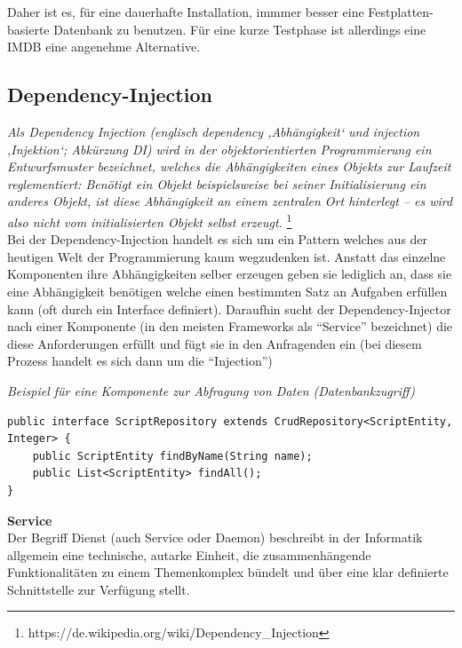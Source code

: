 Daher ist es, für eine dauerhafte Installation, immmer besser eine Festplatten-basierte Datenbank zu benutzen. Für eine kurze Testphase ist allerdings eine IMDB eine angenehme Alternative.

\subsection{Dependency-Injection}

\emph{\glqq   
Als Dependency Injection (englisch dependency ‚Abhängigkeit‘ und injection ‚Injektion‘; Abkürzung DI) wird in der objektorientierten Programmierung ein Entwurfsmuster bezeichnet, welches die Abhängigkeiten eines Objekts zur Laufzeit reglementiert: Benötigt ein Objekt beispielsweise bei seiner Initialisierung ein anderes Objekt, ist diese Abhängigkeit an einem zentralen Ort hinterlegt – es wird also nicht vom initialisierten Objekt selbst erzeugt. \grqq} \footnote{https://de.wikipedia.org/wiki/Dependency\_Injection} \\ 

Bei der Dependency-Injection handelt es sich um ein Pattern welches aus der heutigen Welt der Programmierung kaum wegzudenken ist. Anstatt das einzelne Komponenten ihre Abhängigkeiten selber erzeugen geben sie lediglich an, dass sie eine Abhängigkeit benötigen welche einen bestimmten Satz an Aufgaben erfüllen kann (oft durch ein Interface definiert). Daraufhin sucht der Dependency-Injector nach einer Komponente (in den meisten Frameworks als ``Service'' bezeichnet) die diese Anforderungen erfüllt und fügt sie in den Anfragenden ein (bei diesem Prozess handelt es sich dann um die ``Injection'') \\

\begin{minipage}{\textwidth}
\emph{Beispiel für eine Komponente zur Abfragung von Daten (Datenbankzugriff)}
\begin{lstlisting}
public interface ScriptRepository extends CrudRepository<ScriptEntity, Integer> {
	public ScriptEntity findByName(String name);
	public List<ScriptEntity> findAll();
}
\end{lstlisting} 
\end{minipage}


\textbf{Service}\\
Der Begriff Dienst (auch Service oder Daemon) beschreibt in der Informatik allgemein eine technische, autarke Einheit, die zusammenhängende Funktionalitäten zu einem Themenkomplex bündelt und über eine klar definierte Schnittstelle zur Verfügung stellt.\\
 
